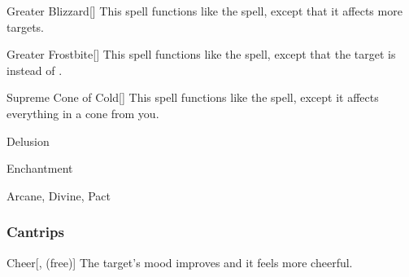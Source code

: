 \lowercase{\hypertarget{spell:Greater Blizzard}{}}\label{spell:Greater Blizzard}
\begin{freeability}[\nth{5}]{\hypertarget{spell:Greater Blizzard}{Greater Blizzard}}[]
This spell functions like the  spell, except that it affects more targets.
\end{freeability}
\vspace{0.25em}



\lowercase{\hypertarget{spell:Greater Frostbite}{}}\label{spell:Greater Frostbite}
\begin{freeability}[\nth{5}]{\hypertarget{spell:Greater Frostbite}{Greater Frostbite}}[]
This spell functions like the  spell, except that the target is  instead of .
\end{freeability}
\vspace{0.25em}



\lowercase{\hypertarget{spell:Supreme Cone of Cold}{}}\label{spell:Supreme Cone of Cold}
\begin{freeability}[\nth{5}]{\hypertarget{spell:Supreme Cone of Cold}{Supreme Cone of Cold}}[]
This spell functions like the  spell, except it affects everything in a \areahuge cone from you.
\end{freeability}
\vspace{0.25em}


\newpage
\begin{spellsection}{Delusion}

\begin{spellheader}
\end{spellheader}


 Enchantment

 Arcane, Divine, Pact

\subsubsection{Cantrips}


\begin{freeability}{Cheer}[,  (free)]
The target's mood improves and it feels more cheerful.
\end{freeability}

\end{spellsection}



